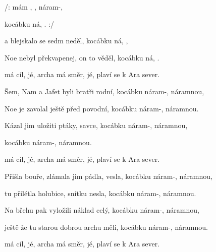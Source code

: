 

\zr
/:  mám  , , náram-,

kocábku ná, . :/
\kr

\zs
{} a blejskalo se sedm neděl,
kocábku ná, ,

Noe nebyl překvapenej, on to věděl,
kocábku ná, .
\ks

\zr  \kr

\zr
{} má cíl, jé, archa má směr, jé,
plaví se k Ara  sever.
\kr

\zr  \kr

\zs
Šem, Nam a Jafet byli bratři rodní,
kocábku náram-, náramnou,

Noe je zavolal ještě před povodní,
kocábku náram-, náramnou.
\ks

\zs
Kázal jim uložiti ptáky, savce,
kocábku náram-, náramnou,

kocábku náram-, náramnou.
\ks

\zr  \kr

\zr
{} má cíl, jé, archa má směr, jé,
plaví se k Ara  sever.
\kr

\zr  \kr

\zs
Přišla bouře, zlámala jim pádla, vesla,
kocábku náram-, náramnou,

tu přilétla holubice, snítku nesla,
kocábku náram-, náramnou.
\ks

\zs
Na břehu pak vyložili náklad celý,
kocábku náram-, náramnou,

ještě že tu starou dobrou archu měli,
kocábku náram-, náramnou.
\ks

\zr  \kr

\zr
{} má cíl, jé, archa má směr, jé,
plaví se k Ara  sever.
\kr

\zr  \kr

\kp





